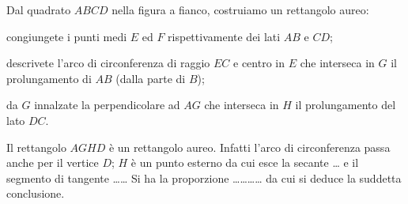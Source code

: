 \noindent\begin{minipage}{0.7\textwidth}\parindent15pt
\begin{esercizio}
\label{ese:6.112}
Dal quadrato $ABCD$ nella figura a fianco, costruiamo un rettangolo 
aureo:
\begin{enumerate*}
\item congiungete i punti medi $E$ ed $F$ rispettivamente dei lati 
$AB$ e $CD$;
\item descrivete l'arco di circonferenza di raggio $EC$ e centro in 
$E$ che interseca in $G$ il prolungamento di $AB$ (dalla parte di 
$B$);
\item da $G$ innalzate la perpendicolare ad $AG$ che interseca in $H$ 
il prolungamento del lato $DC$.
\end{enumerate*}
Il rettangolo $AGHD$ è un rettangolo aureo. Infatti l'arco di 
circonferenza passa anche per il vertice $D$; $H$ è un punto esterno 
da cui esce la secante \ldots{} e il segmento di tangente 
\ldots\ldots{}
Si ha la proporzione \ldots\ldots\ldots\ldots{} da cui si deduce la 
suddetta conclusione.
\end{esercizio}
\end{minipage}\hfil
\begin{minipage}{0.3\textwidth}
	\centering
\end{minipage}

